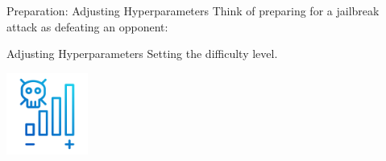 \documentclass{beamer}
\begin{document}
\begin{frame}{Preparation: Adjusting Hyperparameters}
    Think of preparing for a jailbreak attack as defeating an opponent:
    \vspace{1cm}
    \begin{block}{Adjusting Hyperparameters}
        Setting the difficulty level.
    \end{block}
    \vspace{0.5cm} %

    \centering
    \includegraphics[width=0.2\textwidth]{stickers/hyperparameters.png} %
\end{frame}
\end{document}
